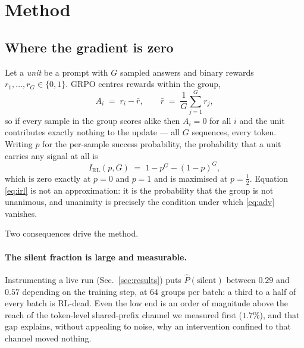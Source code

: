 \section{Method}
\label{sec:method}

\subsection{Where the gradient is zero}
\label{sec:silence}

Let a \emph{unit} be a prompt with $G$ sampled answers and binary rewards
$r_1,\dots,r_G\in\{0,1\}$. GRPO centres rewards within the group,
%
\begin{equation}
  A_i \;=\; r_i - \bar r,
  \qquad
  \bar r \;=\; \frac{1}{G}\sum_{j=1}^{G} r_j ,
  \label{eq:adv}
\end{equation}
%
so if every sample in the group scores alike then $A_i=0$ for all $i$ and the unit
contributes exactly nothing to the update --- all $G$ sequences, every token. Writing
$p$ for the per-sample success probability, the probability that a unit carries any
signal at all is
%
\begin{equation}
  I_{\mathrm{RL}}(p,G) \;=\; 1 - p^{G} - (1-p)^{G},
  \label{eq:irl}
\end{equation}
%
which is zero exactly at $p=0$ and $p=1$ and is maximised at $p=\tfrac12$. Equation
\eqref{eq:irl} is not an approximation: it is the probability that the group is not
unanimous, and unanimity is precisely the condition under which \eqref{eq:adv} vanishes.

Two consequences drive the method.

\paragraph{The silent fraction is large and measurable.} Instrumenting a live run
(Sec.~\ref{sec:results}) puts $\hat{P}(\text{silent})$ between $0.29$ and $0.57$ depending on
the training step, at $64$ groups per batch: a third to a half of every batch is RL-dead.
Even the low end is an order of magnitude above the reach of the token-level shared-prefix
channel we measured first ($1.7\%$), and that gap explains, without appealing to noise, why
an intervention confined to that channel moved nothing.

